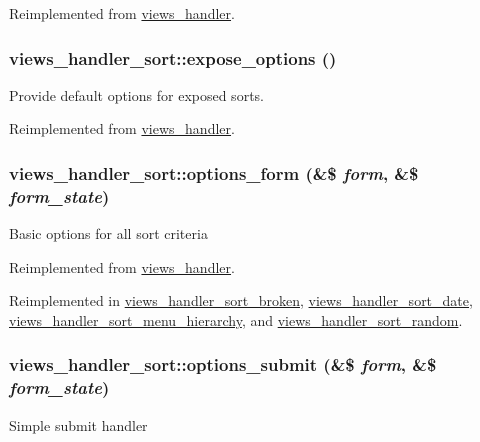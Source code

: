 Reimplemented from \hyperlink{classviews__handler_af462ac68a6853bed2a537a7fb908d807}{views\_\-handler}.\hypertarget{classviews__handler__sort_a7a27b9f392c9e0dcece1b08e9b05f3ec}{
\subsubsection[{expose\_\-options}]{\setlength{\rightskip}{0pt plus 5cm}views\_\-handler\_\-sort::expose\_\-options ()}}
\label{classviews__handler__sort_a7a27b9f392c9e0dcece1b08e9b05f3ec}
Provide default options for exposed sorts. 

Reimplemented from \hyperlink{classviews__handler_a2db9f3127a5364b17fb775cede2f43a6}{views\_\-handler}.\hypertarget{classviews__handler__sort_aba953218e09ab9da8f6ed0a67f046455}{
\subsubsection[{options\_\-form}]{\setlength{\rightskip}{0pt plus 5cm}views\_\-handler\_\-sort::options\_\-form (\&\$ {\em form}, \/  \&\$ {\em form\_\-state})}}
\label{classviews__handler__sort_aba953218e09ab9da8f6ed0a67f046455}
Basic options for all sort criteria 

Reimplemented from \hyperlink{classviews__handler_aa41fcf16b177eb03e35facbae6320f74}{views\_\-handler}.

Reimplemented in \hyperlink{classviews__handler__sort__broken_a57d7f6176962083d4c17cbf448cb792f}{views\_\-handler\_\-sort\_\-broken}, \hyperlink{classviews__handler__sort__date_a622c39d35c93e620cc6fa6ae2ab37ab4}{views\_\-handler\_\-sort\_\-date}, \hyperlink{classviews__handler__sort__menu__hierarchy_a845b181c31d1e5e0da9a99663ad195e3}{views\_\-handler\_\-sort\_\-menu\_\-hierarchy}, and \hyperlink{classviews__handler__sort__random_a51a854154f820622661702ec10532cdb}{views\_\-handler\_\-sort\_\-random}.\hypertarget{classviews__handler__sort_a237ebc26eda2bb393e56f9cb9eea16da}{
\subsubsection[{options\_\-submit}]{\setlength{\rightskip}{0pt plus 5cm}views\_\-handler\_\-sort::options\_\-submit (\&\$ {\em form}, \/  \&\$ {\em form\_\-state})}}
\label{classviews__handler__sort_a237ebc26eda2bb393e56f9cb9eea16da}
Simple submit handler 

